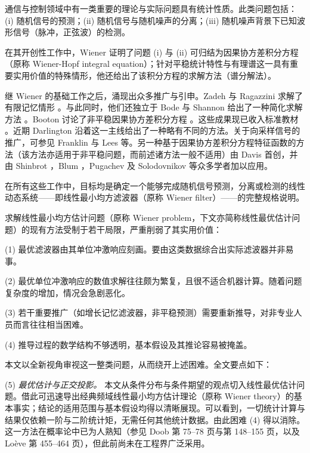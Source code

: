 通信与控制领域中有一类重要的理论与实际问题具有统计性质。此类问题包括：(i) 随机信号的预测；(ii) 随机信号与随机噪声的分离；(iii) 随机噪声背景下已知波形信号（脉冲，正弦波）的检测。

在其开创性工作中，Wiener \cite{r01} 证明了问题 (i) 与 (ii) 可归结为因果协方差积分方程（原称 Wiener-Hopf integral equation）；针对平稳统计特性与有理谱这一具有重要实用价值的特殊情形，他还给出了该积分方程的求解方法（谱分解法）。

继 Wiener 的基础工作之后，涌现出众多推广与引申。Zadeh 与 Ragazzini 求解了有限记忆情形 \cite{r02}。与此同时，他们还独立于 Bode 与 Shannon \cite{r03} 给出了一种简化求解方法 \cite{r02}。Booton 讨论了非平稳因果协方差积分方程 \cite{r04}。这些成果现已收入标准教材 \cite{r05,r06}。近期 Darlington \cite{r07} 沿着这一主线给出了一种略有不同的方法。关于向采样信号的推广，可参见 Franklin \cite{r08} 与 Lees \cite{r09} 等。另一种基于因果协方差积分方程特征函数的方法（该方法亦适用于非平稳问题，而前述诸方法一般不适用）由 Davis \cite{r10} 首创，并由 Shinbrot \cite{r11}，Blum \cite{r12}，Pugachev \cite{r13} 及 Solodovnikov \cite{r14} 等众多学者加以应用。

在所有这些工作中，目标均是确定一个能够完成随机信号预测，分离或检测的线性动态系统——即线性最小均方滤波器（原称 Wiener filter）——的完整规格说明。

求解线性最小均方估计问题（原称 Wiener problem，下文亦简称线性最优估计问题）的现有方法受制于若干局限，严重削弱了其实用价值：

(1) 最优滤波器由其单位冲激响应刻画。要由这类数据综合出实际滤波器并非易事。

(2) 最优单位冲激响应的数值求解往往颇为繁复，且很不适合机器计算。随着问题复杂度的增加，情况会急剧恶化。

(3) 若干重要推广（如增长记忆滤波器，非平稳预测）需要重新推导，对非专业人员而言往往相当困难。

(4) 推导过程的数学结构不够透明，基本假设及其推论容易被掩盖。

本文以全新视角审视这一整类问题，从而绕开上述困难。全文要点如下：

(5) \emph{最优估计与正交投影。} 本文从条件分布与条件期望的观点切入线性最优估计问题。借此可迅速导出经典频域线性最小均方估计理论（原称 Wiener theory）的基本事实；结论的适用范围与基本假设均得以清晰展现。可以看到，一切统计计算与结果仅依赖一阶与二阶统计矩，无需任何其他统计数据。由此困难 (4) 得以消除。这一方法在概率论中已为人熟知（参见 Doob \cite{r15} 第 75–78 页与第 148–155 页，以及 Loève \cite{r16} 第 455–464 页），但此前尚未在工程界广泛采用。

